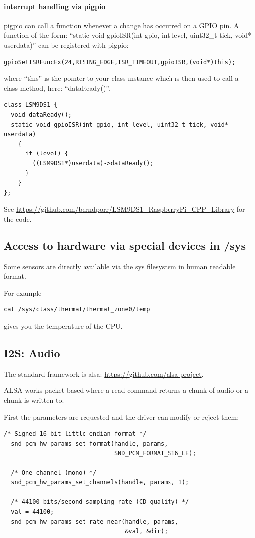 \documentclass[12pt]{report}
\begin{document}
\paragraph{interrupt handling via pigpio}
pigpio can call a function whenever a change has occurred on a GPIO pin.
A function of the form:
``static void gpioISR(int gpio, int level, uint32\_t tick, void* userdata)''
can be registered with pigpio:
\begin{verbatim}
gpioSetISRFuncEx(24,RISING_EDGE,ISR_TIMEOUT,gpioISR,(void*)this);
\end{verbatim}
where ``this'' is the pointer to your class instance which is then used
to call a class method, here: ``dataReady()''.
\begin{verbatim}
class LSM9DS1 {
  void dataReady();
  static void gpioISR(int gpio, int level, uint32_t tick, void* userdata)
    {
      if (level) {
        ((LSM9DS1*)userdata)->dataReady();
      }
    }
};
\end{verbatim}
See \url{https://github.com/berndporr/LSM9DS1_RaspberryPi_CPP_Library} for the code.

\subsection{Access to hardware via special devices in /sys}
Some sensors are directly available via the sys filesystem in human readable format.

For example
\begin{verbatim}
cat /sys/class/thermal/thermal_zone0/temp
\end{verbatim}
gives you the temperature of the CPU.




\subsection{I2S: Audio}
The standard framework is alsa: \url{https://github.com/alsa-project}.

ALSA works packet based where a read command
returns a chunk of audio or a chunk is written to.

First the parameters are requested and the driver can modify or
reject them:
\begin{verbatim}
/* Signed 16-bit little-endian format */
  snd_pcm_hw_params_set_format(handle, params,
                               SND_PCM_FORMAT_S16_LE);

  /* One channel (mono) */
  snd_pcm_hw_params_set_channels(handle, params, 1);

  /* 44100 bits/second sampling rate (CD quality) */
  val = 44100;
  snd_pcm_hw_params_set_rate_near(handle, params,
                                  &val, &dir);
\end{verbatim}
\end{document}

